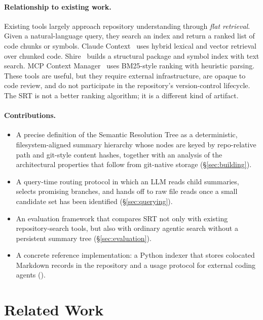 \documentclass[11pt,a4paper]{article}
\newcommand{\srt}{\textsc{SRT}}
\begin{document}
\paragraph{Relationship to existing work.}
Existing tools largely approach repository understanding through \emph{flat retrieval}.
Given a natural-language query, they search an index and return a ranked list of code chunks or symbols.
Claude Context~\cite{claudecontext} uses hybrid lexical and vector retrieval over chunked code.
Shire~\cite{shire} builds a structural package and symbol index with text search.
MCP Context Manager~\cite{mcpcontext} uses BM25-style ranking with heuristic parsing.
These tools are useful, but they require external infrastructure, are opaque to code review, and do not participate in the repository's version-control lifecycle.
The \srt{} is not a better ranking algorithm; it is a different kind of artifact.

\paragraph{Contributions.}
\begin{itemize}[nosep]
    \item A precise definition of the Semantic Resolution Tree as a deterministic, filesystem-aligned summary hierarchy whose nodes are keyed by repo-relative path and git-style content hashes, together with an analysis of the architectural properties that follow from git-native storage (\S\ref{sec:building}).
    \item A query-time routing protocol in which an LLM reads child summaries, selects promising branches, and hands off to raw file reads once a small candidate set has been identified (\S\ref{sec:querying}).
    \item An evaluation framework that compares \srt{} not only with existing repository-search tools, but also with ordinary agentic search without a persistent summary tree (\S\ref{sec:evaluation}).
    \item A concrete reference implementation: a Python indexer that stores colocated Markdown records in the repository and a usage protocol for external coding agents ().
\end{itemize}

\section{Related Work}\label{sec:related}
\end{document}
